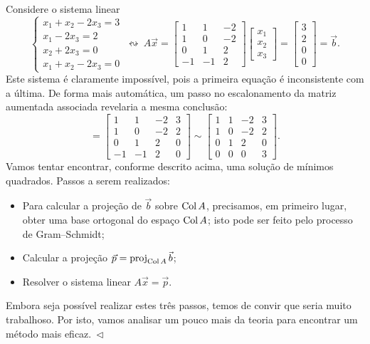\documentclass[../livro.tex]{subfiles}  %
\begin{document}
\begin{example}\label{exp:minquad1}
  Considere o sistema linear
  \begin{equation}
  \left\{
    \begin{array}{ll}
      x_1 + x_2 - 2x_3 = 3 \\
      x_1  - 2x_3 = 2 \\
      x_2 + 2x_3 = 0 \\
      x_1 + x_2 - 2x_3 = 0
    \end{array}
  \right. \ \leftrightsquigarrow  \
  A \vec{x} = \begin{bmatrix}
    1 & 1 & -2 \\ 1 & 0 & -2 \\ 0 & 1 & 2 \\ -1 & -1 & 2
  \end{bmatrix}
  \begin{bmatrix}
    x_1 \\ x_2 \\ x_3
  \end{bmatrix} =
  \begin{bmatrix}
    3 \\ 2 \\ 0 \\ 0
  \end{bmatrix} = \vec{b}.
  \end{equation} Este sistema é claramente impossível, pois a primeira equação é inconsistente com a última. De forma mais automática, um passo no escalonamento da matriz aumentada associada revelaria a mesma conclusão:
  \begin{equation}
  [\, A \ | \ \vec{b} \, ] = \begin{bmatrix}
    1 & 1 & -2 & 3 \\ 1 & 0 & -2 & 2 \\ 0 & 1 & 2 & 0 \\ -1 & -1 & 2 & 0
  \end{bmatrix}   \sim
  \begin{bmatrix}
    1 & 1 & -2 & 3 \\ 1 & 0 & -2 & 2 \\ 0 & 1 & 2 & 0 \\ 0 & 0 & 0 & 3
  \end{bmatrix} .
  \end{equation} Vamos tentar encontrar, conforme descrito acima, uma solução de mínimos quadrados. Passos a serem realizados:
  \begin{itemize}
  \item Para calcular a projeção de $\vec{b}$ sobre $\operatorname{Col} A$, precisamos, em primeiro lugar, obter uma base ortogonal do espaço $\operatorname{Col} A$; isto pode ser feito pelo processo de Gram--Schmidt;
  \item Calcular a projeção $\vec{p} = \operatorname{proj}_{\operatorname{Col} A} \vec{b}$;
  \item Resolver o sistema linear $A \vec{x} = \vec{p}$.
  \end{itemize} Embora seja possível realizar estes três passos, temos de convir que seria muito trabalhoso. Por isto, vamos analisar um pouco mais da teoria para encontrar um método mais eficaz$. \ \lhd$
\end{example}
\end{document}
